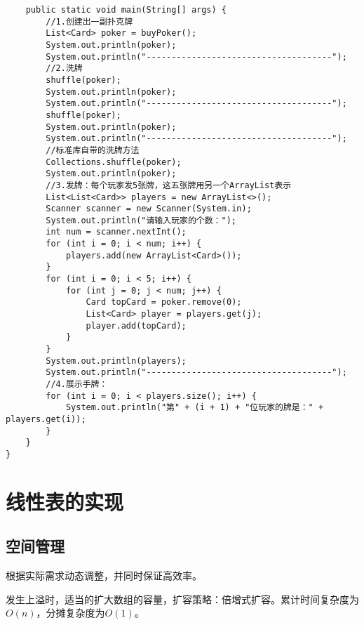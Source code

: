 \documentclass[a4paper]{report}
\begin{document}
\begin{lstlisting}
    public static void main(String[] args) {
        //1.创建出一副扑克牌
        List<Card> poker = buyPoker();
        System.out.println(poker);
        System.out.println("-------------------------------------");
        //2.洗牌
        shuffle(poker);
        System.out.println(poker);
        System.out.println("-------------------------------------");
        shuffle(poker);
        System.out.println(poker);
        System.out.println("-------------------------------------");
        //标准库自带的洗牌方法
        Collections.shuffle(poker);
        System.out.println(poker);
        //3.发牌：每个玩家发5张牌，这五张牌用另一个ArrayList表示
        List<List<Card>> players = new ArrayList<>();
        Scanner scanner = new Scanner(System.in);
        System.out.println("请输入玩家的个数：");
        int num = scanner.nextInt();
        for (int i = 0; i < num; i++) {
            players.add(new ArrayList<Card>());
        }
        for (int i = 0; i < 5; i++) {
            for (int j = 0; j < num; j++) {
                Card topCard = poker.remove(0);
                List<Card> player = players.get(j);
                player.add(topCard);
            }
        }
        System.out.println(players);
        System.out.println("-------------------------------------");
        //4.展示手牌：
        for (int i = 0; i < players.size(); i++) {
            System.out.println("第" + (i + 1) + "位玩家的牌是：" + players.get(i));
        }
    }
}
\end{lstlisting}
\section{线性表的实现}
\subsection{空间管理}
根据实际需求动态调整，并同时保证高效率。

发生上溢时，适当的扩大数组的容量，扩容策略：倍增式扩容。累计时间复杂度为$O(n)$，分摊复杂度为$O(1)$。
\end{document}
